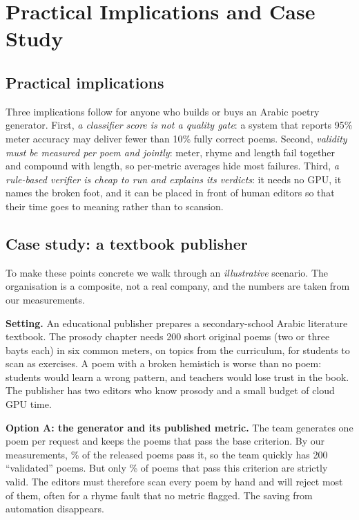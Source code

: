 \section{Practical Implications and Case Study}
\label{sec:case}

\subsection{Practical implications}
Three implications follow for anyone who builds or buys an Arabic poetry generator. First, \emph{a classifier score is
not a quality gate}: a system that reports 95\% meter accuracy may deliver fewer than 10\% fully correct poems. Second,
\emph{validity must be measured per poem and jointly}: meter, rhyme and length fail together and compound with length,
so per-metric averages hide most failures. Third, \emph{a rule-based verifier is cheap to run and explains its
verdicts}: it needs no GPU, it names the broken foot, and it can be placed in front of human editors so that their time
goes to meaning rather than to scansion.

\subsection{Case study: a textbook publisher}
To make these points concrete we walk through an \emph{illustrative} scenario. The organisation is a composite, not a
real company, and the numbers are taken from our measurements.

\textbf{Setting.} An educational publisher prepares a secondary-school Arabic literature textbook. The prosody chapter
needs 200 short original poems (two or three bayts each) in six common meters, on topics from the curriculum, for
students to scan as exercises. A poem with a broken hemistich is worse than no poem: students would learn a wrong
pattern, and teachers would lose trust in the book. The publisher has two editors who know prosody and a small budget
of cloud GPU time.

\textbf{Option A: the generator and its published metric.} The team generates one poem per request and keeps the poems
that pass the base criterion. By our measurements, \% of the released poems pass it, so
the team quickly has 200 ``validated'' poems. But only \% of poems that pass this criterion are
strictly valid. The editors must therefore scan every poem by hand and will reject most of them, often for a rhyme
fault that no metric flagged. The saving from automation disappears.

